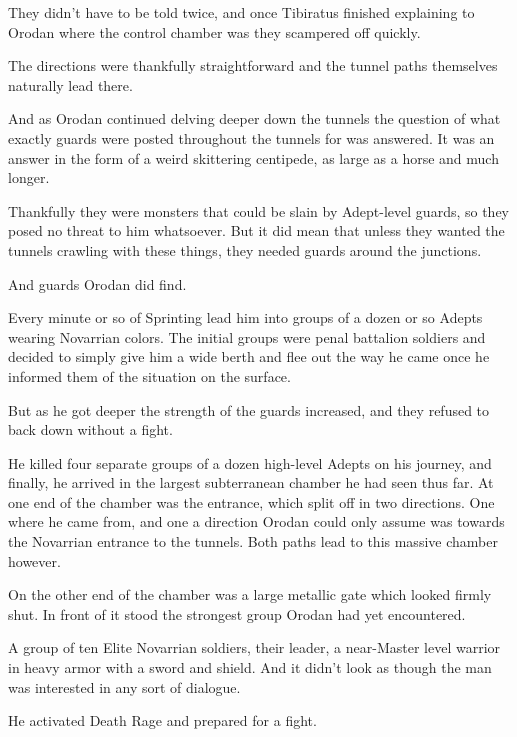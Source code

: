 \documentclass[a4paper,10pt]{book}
\begin{document}
They didn’t have to be told twice, and once Tibiratus finished explaining to Orodan where the control chamber was they scampered off quickly.\par
The directions were thankfully straightforward and the tunnel paths themselves naturally lead there.\par
And as Orodan continued delving deeper down the tunnels the question of what exactly guards were posted throughout the tunnels for was answered. It was an answer in the form of a weird skittering centipede, as large as a horse and much longer.\par
Thankfully they were monsters that could be slain by Adept-level guards, so they posed no threat to him whatsoever. But it did mean that unless they wanted the tunnels crawling with these things, they needed guards around the junctions.\par
And guards Orodan did find.\par
Every minute or so of Sprinting lead him into groups of a dozen or so Adepts wearing Novarrian colors. The initial groups were penal battalion soldiers and decided to simply give him a wide berth and flee out the way he came once he informed them of the situation on the surface.\par
But as he got deeper the strength of the guards increased, and they refused to back down without a fight.\par
He killed four separate groups of a dozen high-level Adepts on his journey, and finally, he arrived in the largest subterranean chamber he had seen thus far. At one end of the chamber was the entrance, which split off in two directions. One where he came from, and one a direction Orodan could only assume was towards the Novarrian entrance to the tunnels. Both paths lead to this massive chamber however.\par
On the other end of the chamber was a large metallic gate which looked firmly shut. In front of it stood the strongest group Orodan had yet encountered.\par
A group of ten Elite Novarrian soldiers, their leader, a near-Master level warrior in heavy armor with a sword and shield. And it didn’t look as though the man was interested in any sort of dialogue.\par
He activated Death Rage and prepared for a fight.\par
\end{document}
